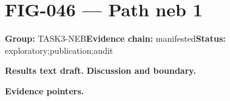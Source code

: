\clearpage
\section{FIG-046 --- Path neb 1}
\label{figpage:fig-046}
\textbf{Group:} TASK3-NEB\quad \textbf{Evidence chain:} manifested\quad \textbf{Status:} exploratory;publication;audit

\textbf{Results text draft.} 
\textbf{Discussion and boundary.} 


\textbf{Evidence pointers.}



\vfill
